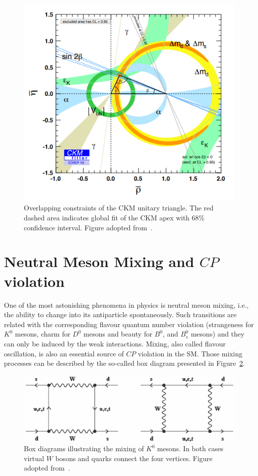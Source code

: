 \begin{figure}
\centering
\includegraphics[scale=0.7]{figures/Unitary_triangle_constrains.PNG}
\caption{Overlapping constraints of the CKM unitary triangle. The red dashed area indicates global fit of the CKM apex with 68\% confidence interval. Figure adopted from~\cite{CKMFitter}.
\label{fig:triangle}}
\end{figure}


\section{Neutral Meson Mixing and $CP$ violation}

One of the most astonishing phenomena in physics is neutral meson mixing, i.e., the ability to change into its antiparticle spontaneously. Such transitions are related with the corresponding flavour quantum number violation (strangeness for $K^0$ mesons, charm for $D^0$ mesons and beauty for $B^0$, and $B^0_ s$ mesons) and they can only be induced by the weak interactions. Mixing, also called flavour oscillation, is also an essential source of $CP$ violation in the SM. Those mixing processes can be described by the so-called box diagram presented in Figure~\ref{fig:Mixinig}. 


\begin{figure}
\centering
\includegraphics[scale=0.9]{figures/Box-diagrams-depicting-K-0-K-0-mixing.png}
\caption{Box diagrams illustrating the mixing of $K^{0}$ mesons. In both cases virtual $W$ bosons
and quarks connect the four vertices. Figure adopted from~\cite{Mixing}.
\label{fig:Mixinig}}
\end{figure}


